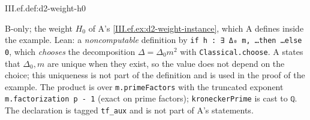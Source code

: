 \begin{definition}
\bonly
{}
\end{definition}
\begin{tfformal}{III.ef.def:d2-weight-h0}
\begin{tffidelity}
B-only; the weight $H_0$ of A's \cref{III.ef.ex:d2-weight-instance}, which A defines inside the example. Lean: a \emph{noncomputable} definition by \texttt{if h : ∃ Δ₀ m, \dots then \dots else 0}, which \emph{chooses} the decomposition $\Delta=\Delta_0m^2$ with \texttt{Classical.choose}. A states that $\Delta_0,m$ are unique when they exist, so the value does not depend on the choice; this uniqueness is not part of the definition and is used in the proof of the example. The product is over \texttt{m.primeFactors} with the truncated exponent \texttt{m.factorization p - 1} (exact on prime factors); \texttt{kroneckerPrime} is cast to \texttt{ℚ}. The declaration is tagged \texttt{tf\_aux} and is not part of A's statements.
\end{tffidelity}
\end{tfformal}

